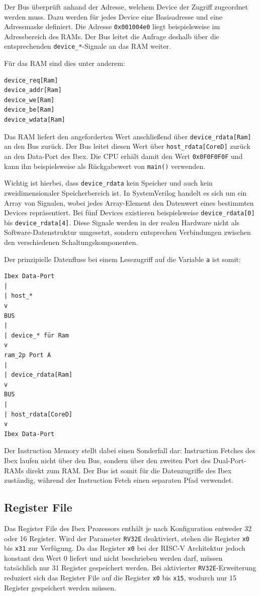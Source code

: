 \documentclass[a4paper,11pt]{article}
\begin{document}
Der Bus überprüft anhand der Adresse, welchem Device der Zugriff zugeordnet werden muss. Dazu werden für jedes Device eine Basisadresse und eine Adressmaske definiert. Die Adresse \texttt{0x001004e0} liegt beispielsweise im Adressbereich des RAMs. Der Bus leitet die Anfrage deshalb über die entsprechenden \texttt{device\_*}-Signale an das RAM weiter.

Für das RAM sind dies unter anderem:

\begin{verbatim}
device_req[Ram]
device_addr[Ram]
device_we[Ram]
device_be[Ram]
device_wdata[Ram]
\end{verbatim}

Das RAM liefert den angeforderten Wert anschließend über \texttt{device\_rdata[Ram]} an den Bus zurück. Der Bus leitet diesen Wert über \texttt{host\_rdata[CoreD]} zurück an den Data-Port des Ibex. Die CPU erhält damit den Wert \texttt{0x0F0F0F0F} und kann ihn beispielsweise als Rückgabewert von \texttt{main()} verwenden.

Wichtig ist hierbei, dass \texttt{device\_rdata} kein Speicher und auch kein zweidimensionaler Speicherbereich ist. In SystemVerilog handelt es sich um ein Array von Signalen, wobei jedes Array-Element den Datenwert eines bestimmten Devices repräsentiert. Bei fünf Devices existieren beispielsweise \texttt{device\_rdata[0]} bis \texttt{device\_rdata[4]}. Diese Signale werden in der realen Hardware nicht als Software-Datenstruktur umgesetzt, sondern entsprechen Verbindungen zwischen den verschiedenen Schaltungskomponenten.

Der prinzipielle Datenfluss bei einem Lesezugriff auf die Variable \texttt{a} ist somit:
\newpage
\begin{verbatim}
Ibex Data-Port
|
| host_*
v
BUS
|
| device_* für Ram
v
ram_2p Port A
|
| device_rdata[Ram]
v
BUS
|
| host_rdata[CoreD]
v
Ibex Data-Port
\end{verbatim}

Der Instruction Memory stellt dabei einen Sonderfall dar: Instruction Fetches des Ibex laufen nicht über den Bus, sondern über den zweiten Port des Dual-Port-RAMs direkt zum RAM. Der Bus ist somit für die Datenzugriffe des Ibex zuständig, während der Instruction Fetch einen separaten Pfad verwendet.

\subsection{Register File}
Das Register File des Ibex Prozessors enthält je nach Konfiguration entweder 32 oder 16 Register.
Wird der Parameter \texttt{RV32E} deaktiviert, stehen die Register \texttt{x0} bis \texttt{x31} zur Verfügung.
Da das Register \texttt{x0} bei der RISC-V Architektur jedoch konstant den Wert 0 liefert und nicht beschrieben werden darf, müssen tatsächlich nur 31 Register gespeichert werden.
Bei aktivierter \texttt{RV32E}-Erweiterung reduziert sich das Register File auf die Register \texttt{x0} bis \texttt{x15}, wodurch nur 15 Register gespeichert werden müssen.
\end{document}
